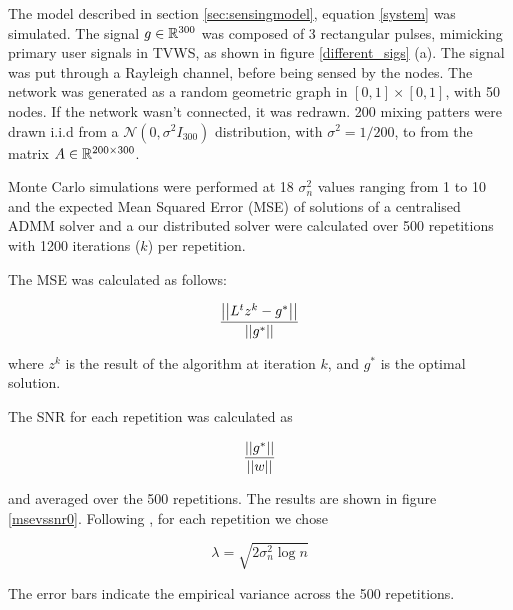 \documentclass[conference]{IEEEtran}
\begin{document}
The model described in section \eqref{sec:sensingmodel}, equation \eqref{system} was simulated. The signal \(g \in {\mathbb{R}}^{300} \) was composed of 3 rectangular pulses, mimicking primary user signals in TVWS, as shown in figure \eqref{different_sigs} (a). The signal was put through a Rayleigh channel, before being sensed by the nodes. The network was generated as a random geometric graph in \([0,1] \times [0,1]\), with 50 nodes. If the network wasn't connected, it was redrawn. 200 mixing patters were drawn i.i.d from a \(\mathcal{N}\left(0, \sigma^2 I_{300} \right) \) distribution, with \(\sigma^2 = 1/200\), to from the matrix \(A\in  {\mathbb{R}}^{200 \times 300}\).

Monte Carlo simulations were performed at 18 \(\sigma^2_n\) values ranging from 1 to 10 and the expected Mean Squared Error (MSE) of solutions of a centralised ADMM solver and a our distributed solver were calculated over 500 repetitions with 1200 iterations (\(k\)) per repetition.

The MSE was calculated as follows:

\begin{equation}
\frac{\left|\left|L^tz^k - g^*\right|\right|}{\left|\left|g^*\right|\right|}
\end{equation}

where \(z^k\) is the result of the algorithm at iteration \(k\), and \(g^*\) is the optimal solution.

The SNR for each repetition was calculated as

\begin{equation}
\frac{\left|\left|g^*\right|\right|}{\left|\left|w\right|\right|}
\end{equation}

and averaged over the 500 repetitions. The results are shown in figure \eqref{msevssnr0}. Following \cite{chen1998atomic}, for each repetition we chose 

\begin{equation}
\lambda = \sqrt{2\sigma^2_n\log{n}}
\end{equation}

The error bars indicate the empirical variance across the 500 repetitions.
\end{document}
